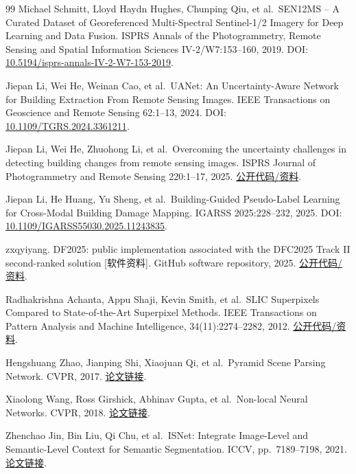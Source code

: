 \documentclass[UTF8,a4paper,zihao=-4,fontset=none]{ctexart}
\begin{document}
\begin{thebibliography}{99}
Michael Schmitt, Lloyd Haydn Hughes, Chunping Qiu, et al.~SEN12MS -- A Curated Dataset of Georeferenced Multi-Spectral Sentinel-1/2 Imagery for Deep Learning and Data Fusion. ISPRS Annals of the Photogrammetry, Remote Sensing and Spatial Information Sciences IV-2/W7:153--160, 2019. DOI: \href{https://doi.org/10.5194/isprs-annals-IV-2-W7-153-2019}{10.5194/isprs-annals-IV-2-W7-153-2019}.

Jiepan Li, Wei He, Weinan Cao, et al.~UANet: An Uncertainty-Aware Network for Building Extraction From Remote Sensing Images. IEEE Transactions on Geoscience and Remote Sensing 62:1--13, 2024. DOI: \href{https://doi.org/10.1109/TGRS.2024.3361211}{10.1109/TGRS.2024.3361211}.

Jiepan Li, Wei He, Zhuohong Li, et al.~Overcoming the uncertainty challenges in detecting building changes from remote sensing images. ISPRS Journal of Photogrammetry and Remote Sensing 220:1--17, 2025. \href{https://github.com/Henryjiepanli/Building-Guided-Pseudo-Label-Learning-for-Cross-Modal-Building-Damage-Mapping/blob/main/README.md}{公开代码/资料}.

Jiepan Li, He Huang, Yu Sheng, et al.~Building-Guided Pseudo-Label Learning for Cross-Modal Building Damage Mapping. IGARSS 2025:228--232, 2025. DOI: \href{https://doi.org/10.1109/IGARSS55030.2025.11243835}{10.1109/IGARSS55030.2025.11243835}.

zxqyiyang. DF2025: public implementation associated with the DFC2025 Track II second-ranked solution {[}软件资料{]}. GitHub software repository, 2025. \href{https://github.com/zxqyiyang/DF2025}{公开代码/资料}.

Radhakrishna Achanta, Appu Shaji, Kevin Smith, et al.~SLIC Superpixels Compared to State-of-the-Art Superpixel Methods. IEEE Transactions on Pattern Analysis and Machine Intelligence, 34(11):2274--2282, 2012. \href{https://github.com/achanta/SLIC}{公开代码/资料}.

Hengshuang Zhao, Jianping Shi, Xiaojuan Qi, et al.~Pyramid Scene Parsing Network. CVPR, 2017. \href{https://arxiv.org/abs/1612.01105}{论文链接}.

Xiaolong Wang, Ross Girshick, Abhinav Gupta, et al.~Non-local Neural Networks. CVPR, 2018. \href{https://arxiv.org/abs/1711.07971}{论文链接}.

Zhenchao Jin, Bin Liu, Qi Chu, et al.~ISNet: Integrate Image-Level and Semantic-Level Context for Semantic Segmentation. ICCV, pp.~7189--7198, 2021. \href{https://arxiv.org/abs/2108.12382}{论文链接}.


\end{thebibliography}
\end{document}
